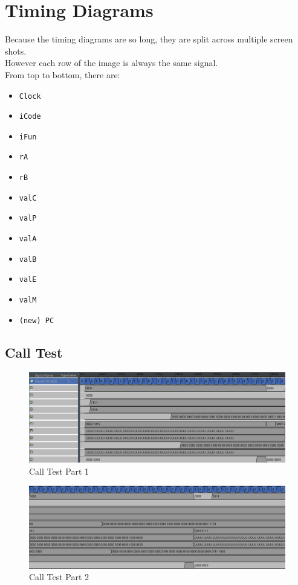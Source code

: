 \clearpage
\section*{Timing Diagrams}
Because the timing diagrams are so long, they are split across multiple screen shots.\\
However each row of the image is always the same signal.\\
From top to bottom, there are:
\begin{itemize}
    \item \verb+Clock+
    \item \verb+iCode+
    \item \verb+iFun+
    \item \verb+rA+
    \item \verb+rB+
    \item \verb+valC+
    \item \verb+valP+
    \item \verb+valA+
    \item \verb+valB+
    \item \verb+valE+
    \item \verb+valM+
    \item \verb+(new) PC+
\end{itemize}

\clearpage
\subsection*{Call Test}
\begin{figure}[!ht]
    \centering
    \includegraphics[width=\textwidth]{Images/Call Test Part 1.png}
    \caption{Call Test Part 1}
\end{figure}

\begin{figure}[!ht]
    \centering
    \includegraphics[width=\textwidth]{Images/Call Test Part 2.png}
    \caption{Call Test Part 2}
\end{figure}


